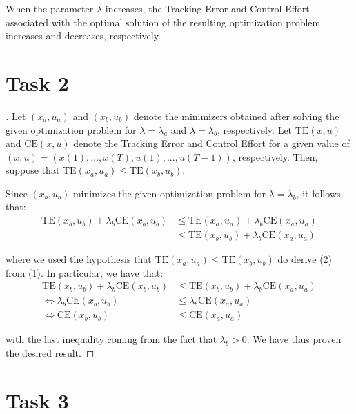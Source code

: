 \documentclass[12pt]{article}
\begin{document}
When the parameter $\lambda$ increases, the Tracking Error and Control Effort associated with the optimal solution of the resulting optimization problem increases and decreases, respectively. \\

\section{Task 2}

\begin{proof}[\unskip\nopunct]
    Let $(x_a, u_a)$ and $(x_b, u_b)$ denote the minimizers obtained after solving the given optimization problem for $\lambda = \lambda_{a}$ and $\lambda = \lambda_{b}$, respectively. Let $\text{TE}(x, u)$ and $\text{CE}(x, u)$ denote the Tracking Error and Control Effort for a given value of $(x, u) = (x(1), ..., x(T), u(1), ..., u(T - 1))$, respectively.
    Then, suppose that $\text{TE}(x_a, u_a) \le \text{TE}(x_b, u_b)$.

    Since $(x_b, u_b)$ minimizes the given optimization problem for $\lambda = \lambda_b$, it follows that:
    \vspace{-0.3em}
    \begin{align}
        \text{TE}(x_b, u_b) + \lambda_b \text{CE}(x_b, u_b) & \le 
        \text{TE}(x_a, u_a) + \lambda_b \text{CE}(x_a, u_a) \\
        & \le \text{TE}(x_b, u_b) + \lambda_b \text{CE}(x_a, u_a)
    \end{align}

    where we used the hypothesis that $\text{TE}(x_a, u_a) \le \text{TE}(x_b, u_b)$ do derive (2) from (1). In particular, we have that:
    \vspace{-0.3em}
    \begin{align*}
        \text{TE}(x_b, u_b) + \lambda_b \text{CE}(x_b, u_b) & \le 
        \text{TE}(x_b, u_b) + \lambda_b \text{CE}(x_a, u_a) \\
        \Leftrightarrow \lambda_b \text{CE}(x_b, u_b) & \le 
        \lambda_b \text{CE}(x_a, u_a) \\
        \Leftrightarrow \text{CE}(x_b, u_b) &\le \text{CE}(x_a, u_a)
    \end{align*}

    with the last inequality coming from the fact that $\lambda_b > 0$. We have thus proven the desired result.
\end{proof}

\section{Task 3}
\end{document}
